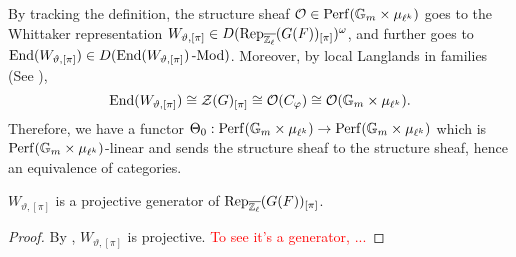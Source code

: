 By tracking the definition, the structure sheaf $\mathcal{O} \in \operatorname{\operatorname{Perf}}(\mathbb{G}_m \times \mu_{\ell^k})$ goes to the Whittaker representation $W_{\vartheta, [\pi]} \in D(\operatorname{\operatorname{Rep}}_{\overline{\mathbb{Z}_{\ell}}}(G(F))_{[\pi]})^{\omega}$, and further goes to $\operatorname{\operatorname{End}}(W_{\vartheta, [\pi]}) \in D(\operatorname{\operatorname{End}}(W_{\vartheta, [\pi]})\operatorname{-Mod})$. Moreover, by local Langlands in families (See \cite{helm2018converse}), 
$$\operatorname{\operatorname{End}}(W_{\vartheta, [\pi]}) \cong \mathcal{Z}(G)_{[\pi]} \cong \mathcal{O}(C_{\varphi}) \cong \mathcal{O}(\mathbb{G}_m \times \mu_{\ell^k}).$$ Therefore, we have a functor $\Theta_0: \operatorname{\operatorname{Perf}}(\mathbb{G}_m \times \mu_{\ell^k}) \to \operatorname{\operatorname{Perf}}(\mathbb{G}_m \times \mu_{\ell^k})$ which is $\operatorname{\operatorname{Perf}}(\mathbb{G}_m \times \mu_{\ell^k})$-linear and sends the structure sheaf to the structure sheaf, hence an equivalence of categories.

\begin{lemma}\label{Lem Whit}
	$W_{\vartheta, [\pi]}$ is a projective generator of $\operatorname{\operatorname{Rep}}_{\overline{\mathbb{Z}_{\ell}}}(G(F))_{[\pi]}$.
\end{lemma}

\begin{proof}
	By \cite[Chapter 3]{helm2016whittaker}, $W_{\vartheta, [\pi]}$ is projective. 
    \textcolor{red}{To see it's a generator, ...}
\end{proof}


